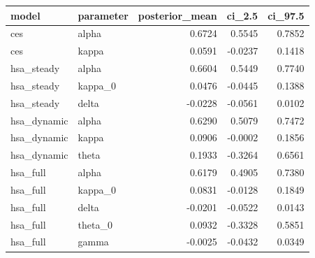 \begin{tabular}{llrrr}
\toprule
model & parameter & posterior\_mean & ci\_2.5 & ci\_97.5 \\
\midrule
ces & alpha & 0.6724 & 0.5545 & 0.7852 \\
ces & kappa & 0.0591 & -0.0237 & 0.1418 \\
hsa\_steady & alpha & 0.6604 & 0.5449 & 0.7740 \\
hsa\_steady & kappa\_0 & 0.0476 & -0.0445 & 0.1388 \\
hsa\_steady & delta & -0.0228 & -0.0561 & 0.0102 \\
hsa\_dynamic & alpha & 0.6290 & 0.5079 & 0.7472 \\
hsa\_dynamic & kappa & 0.0906 & -0.0002 & 0.1856 \\
hsa\_dynamic & theta & 0.1933 & -0.3264 & 0.6561 \\
hsa\_full & alpha & 0.6179 & 0.4905 & 0.7380 \\
hsa\_full & kappa\_0 & 0.0831 & -0.0128 & 0.1849 \\
hsa\_full & delta & -0.0201 & -0.0522 & 0.0143 \\
hsa\_full & theta\_0 & 0.0932 & -0.3328 & 0.5851 \\
hsa\_full & gamma & -0.0025 & -0.0432 & 0.0349 \\
\bottomrule
\end{tabular}
